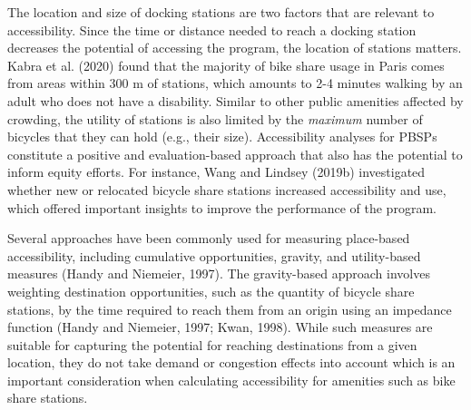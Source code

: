 \documentclass[]{elsarticle} %
\begin{document}
The location and size of docking stations are two factors that are
relevant to accessibility. Since the time or distance needed to reach a
docking station decreases the potential of accessing the program, the
location of stations matters. Kabra et al. (2020) found that the
majority of bike share usage in Paris comes from areas within 300 m of
stations, which amounts to 2-4 minutes walking by an adult who does not
have a disability. Similar to other public amenities affected by
crowding, the utility of stations is also limited by the \emph{maximum}
number of bicycles that they can hold (e.g., their size). Accessibility
analyses for PBSPs constitute a positive and evaluation-based approach
that also has the potential to inform equity efforts. For instance, Wang
and Lindsey (2019b) investigated whether new or relocated bicycle share
stations increased accessibility and use, which offered important
insights to improve the performance of the program.

Several approaches have been commonly used for measuring place-based
accessibility, including cumulative opportunities, gravity, and
utility-based measures (Handy and Niemeier, 1997). The gravity-based
approach involves weighting destination opportunities, such as the
quantity of bicycle share stations, by the time required to reach them
from an origin using an impedance function (Handy and Niemeier, 1997;
Kwan, 1998). While such measures are suitable for capturing the
potential for reaching destinations from a given location, they do not
take demand or congestion effects into account which is an important
consideration when calculating accessibility for amenities such as bike
share stations.
\end{document}
